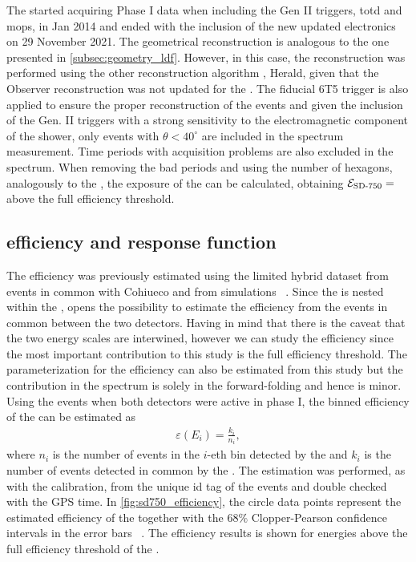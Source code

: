 \documentclass[main.tex]{subfiles}
\begin{document}
The  started acquiring Phase I data when including the Gen II triggers, \gls{totd} and \gls{mops}, in Jan 2014 and ended with the inclusion of the new updated electronics on 29 November 2021.
The geometrical reconstruction is analogous to the one presented in \cref{subsec:geometry_ldf}.
However, in this case, the reconstruction was performed using the other reconstruction algorithm , Herald, given that the Observer reconstruction was not updated for the .%
The fiducial 6T5 trigger is also applied to ensure the proper reconstruction of the events and given the inclusion of the Gen. II triggers with a strong sensitivity to the electromagnetic component of the shower, only events with $\theta<40^\circ$ are included in the spectrum measurement.
Time periods with acquisition problems are also excluded in the spectrum.
When removing the bad periods and using the number of hexagons, analogously to the , the exposure of the  can be calculated, obtaining $\mathcal{E}_{\text{SD-750}}=$\SDSevenFiftyExposure above the full efficiency threshold.

\subsection{ efficiency and response function}
\label{subsec:sd750_efficiency}

The  efficiency was previously estimated using the limited hybrid dataset from events in common with Cohiueco and from simulations ~\cite{2018:Coleman:Thesis}.
Since the  is nested within the , opens the possibility to estimate the efficiency from the events in common between the two detectors.
Having in mind that  there is the caveat that the two energy scales are interwined, however we can study the efficiency since the most important contribution to this study is the full efficiency threshold.
The parameterization for the efficiency can also be estimated from this study but the contribution in the spectrum is solely in the forward-folding and hence is minor.
Using the events when both detectors were active in phase I, the binned efficiency of the  can be estimated as 
\begin{align}
    \varepsilon(E_i)=\frac{k_i}{n_i},
\end{align}
\noindent where $n_i$ is the number of events in the $i$-eth bin detected by the  and $k_i$ is the number of events detected in common by the .
The estimation was performed, as with the calibration, from the unique id tag of the events and double checked with the GPS time.
In \cref{fig:sd750_efficiency}, the circle data points represent the estimated efficiency of the  together with the $68\%$ Clopper-Pearson confidence intervals in the error bars ~\cite{Clopper:1934:BinomialInverval}.
The efficiency results is shown for energies above the full efficiency threshold of the .
\end{document}
